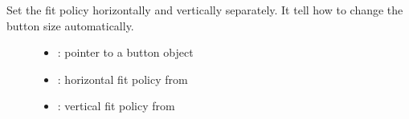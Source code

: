 \documentclass[letterpaper,10pt,english]{sphinxmanual}
\begin{document}
\begin{fulllineitems}
\label{\detokenize{object-types/btn:_CPPv415lv_btn_set_fit2P8lv_obj_t8lv_fit_t8lv_fit_t}}%
\pysigstartmultiline
{}\label{\detokenize{object-types/btn:lv__btn_8h_1a6b49c65cd0fb916015f5cd5d41058f85}}%
\pysigstopmultiline
Set the fit policy horizontally and vertically separately. It tell how to change the button size automatically. \begin{description}
\item[{}] \leavevmode\begin{itemize}
\item {} 
: pointer to a button object 

\item {} 
: horizontal fit policy from  

\item {} 
: vertical fit policy from  

\end{itemize}

\end{description}


\end{fulllineitems}

\end{document}
